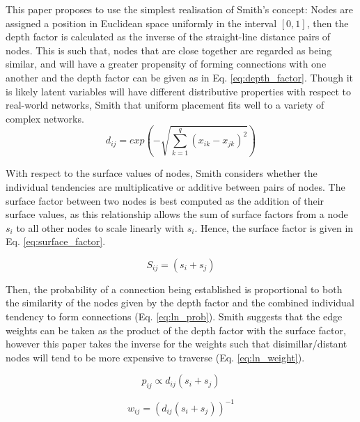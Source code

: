 \documentclass[
	a4paper, %
	10pt, %
	unnumberedsections, %
	twoside, %
]{LTJournalArticle}
\begin{document}
This paper proposes to use the simplest realisation of Smith's concept: Nodes are assigned a position in Euclidean space uniformly in the interval \([0, 1]\), then the depth factor is calculated as the inverse of the straight-line distance pairs of nodes. This is such that, nodes that are close together are regarded as being similar, and will have a greater propensity of forming connections with one another and the depth factor can be given as in Eq. \ref{eq:depth_factor}. Though it is likely latent variables will have different distributive properties with respect to real-world networks, Smith \cite{smith:21} that uniform placement fits well to a variety of complex networks. \\

\begin{equation}
	d_{ij} = exp(-\sqrt{\sum_{k=1}^{q}(x_{ik} - x_{jk})^{2}})
	\label{eq:depth_factor}
\end{equation}

With respect to the surface values of nodes, Smith considers whether the individual tendencies are multiplicative or additive between pairs of nodes. The surface factor between two nodes is best computed as the addition of their surface values, as this relationship allows the sum of surface factors from a node \(s_{i}\) to all other nodes to scale linearly with \(s_{i}\). Hence, the surface factor is given in Eq. \ref{eq:surface_factor}.

\begin{equation}
	S_{ij} = (s_{i} + s_{j}) 
	\label{eq:surface_factor}
\end{equation}

Then, the probability of a connection being established is proportional to both the similarity of the nodes given by the depth factor and the combined individual tendency to form connections (Eq. \ref{eq:ln_prob}). Smith suggests that the edge weights can be taken as the product of the depth factor with the surface factor, however this paper takes the inverse for the weights such that disimillar/distant nodes will tend to be more expensive to traverse (Eq. \ref{eq:ln_weight}). 

\begin{equation}
	p_{ij} \propto d_{ij}(s_{i} + s_{j})
	\label{eq:ln_prob}
\end{equation}

\begin{equation}
	w_{ij} = (d_{ij}(s_{i} + s_{j}))^{-1}
	\label{eq:ln_weight}
\end{equation}
\end{document}
